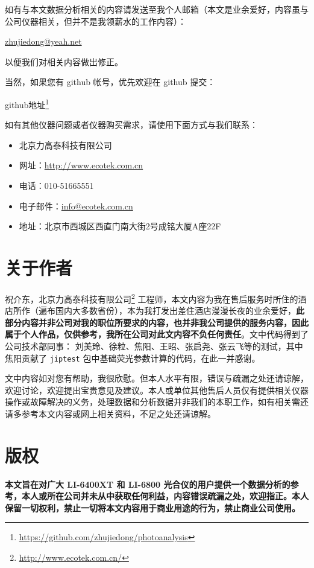 \documentclass[
]{krantz}
\renewcommand{\href}[2]{#2\footnote{\url{#1}}}
\begin{document}
如有与本文数据分析相关的内容请发送至我个人邮箱（本文是业余爱好，内容虽与公司仪器相关，但并不是我领薪水的工作内容）：

\url{zhujiedong@yeah.net}

以便我们对相关内容做出修正。

当然，如果您有 github 帐号，优先欢迎在 github 提交：

\href{https://github.com/zhujiedong/photoanalysis}{github地址}

如有其他仪器问题或者仪器购买需求，请使用下面方式与我们联系：

\begin{itemize}
\item
  北京力高泰科技有限公司
\item
  网址：\url{http://www.ecotek.com.cn}
\item
  电话：010-51665551
\item
  电子邮件：\url{info@ecotek.com.cn}
\item
  地址：北京市西城区西直门南大街2号成铭大厦A座22F
\end{itemize}

\hypertarget{author}{%
\chapter*{关于作者}\label{author}}


祝介东，\href{http://www.ecotek.com.cn/}{北京力高泰科技有限公司} 工程师，本文内容为我在售后服务时所住的酒店所作（遍布国内大多数省份），本为我打发出差住酒店漫漫长夜的业余爱好，\textbf{此部分内容并非公司对我的职位所要求的内容，也并非我公司提供的服务内容，因此属于个人作品，仅供参考，我所在公司对此文内容不负任何责任}。文中代码得到了公司技术部同事： 刘美玲、徐粒、焦阳、王昭、张启尧、张云飞等的测试，其中焦阳贡献了 \texttt{jiptest} 包中基础荧光参数计算的代码，在此一并感谢。

文中内容如对您有帮助，我很欣慰。但本人水平有限，错误与疏漏之处还请谅解，欢迎讨论，欢迎提出宝贵意见及建议。本人或单位其他售后人员仅有提供相关仪器操作或故障解决的义务，处理数据和分析数据并非我们的本职工作，如有相关需还请多参考本文内容或网上相关资料，不足之处还请谅解。

\hypertarget{copyright}{%
\chapter*{版权}\label{copyright}}


\textbf{本文旨在对广大 LI-6400XT 和 LI-6800 光合仪的用户提供一个数据分析的参考，本人或所在公司并未从中获取任何利益，内容错误疏漏之处，欢迎指正。本人保留一切权利，禁止一切将本文内容用于商业用途的行为，禁止商业公司使用。}
\end{document}
